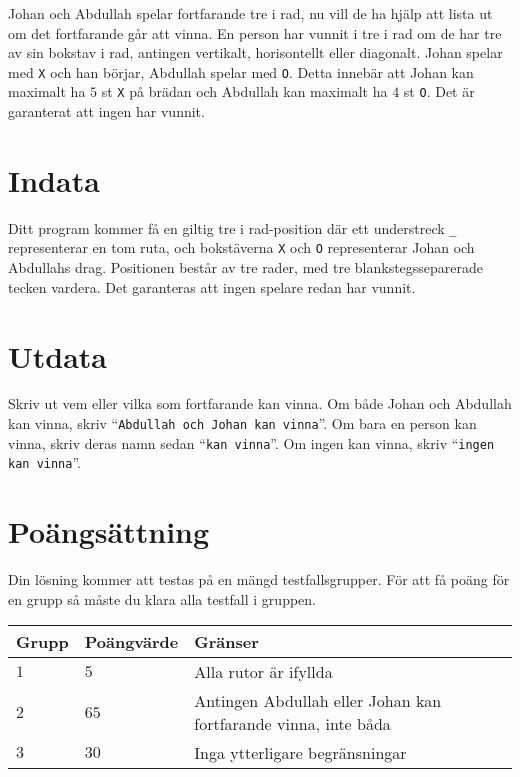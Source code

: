 \noindent
Johan och Abdullah spelar fortfarande tre i rad, nu vill de ha hjälp att lista ut om det fortfarande går att vinna.
En person har vunnit i tre i rad om de har tre av sin bokstav i rad, antingen vertikalt, horisontellt eller diagonalt.
Johan spelar med \texttt{X} och han börjar, Abdullah spelar med \texttt{O}. Detta innebär att Johan kan maximalt ha $5$ st \texttt{X} på brädan och Abdullah kan maximalt ha $4$ st \texttt{O}.
Det är garanterat att ingen har vunnit.



\section*{Indata}
\noindent
Ditt program kommer få en giltig tre i rad-position där ett understreck \texttt{\_} representerar en tom ruta, och bokstäverna \texttt{X} och \texttt{O} representerar Johan och Abdullahs drag.
Positionen består av tre rader, med tre blankstegsseparerade tecken vardera. Det garanteras att ingen spelare redan har vunnit.

\section*{Utdata}
\noindent
Skriv ut vem eller vilka som fortfarande kan vinna.
\noindent
Om både Johan och Abdullah kan vinna, skriv ``\texttt{Abdullah och Johan kan vinna}''.
Om bara en person kan vinna, skriv deras namn sedan ``\texttt{kan vinna}''.
Om ingen kan vinna, skriv ``\texttt{ingen kan vinna}''.

\section*{Poängsättning}
\noindent
Din lösning kommer att testas på en mängd testfallsgrupper.
\noindent
För att få poäng för en grupp så måste du klara alla testfall i gruppen.

\begin{tabular}{| l | l | l |}
\hline
  Grupp & Poängvärde & Gränser \\ \hline
  $1$    & $5$       &  Alla rutor är ifyllda \\ \hline
  $2$    & $65$       &  Antingen Abdullah eller Johan kan fortfarande vinna, inte båda \\ \hline
  $3$    & $30$       &  Inga ytterligare begränsningar \\ \hline
\end{tabular}
